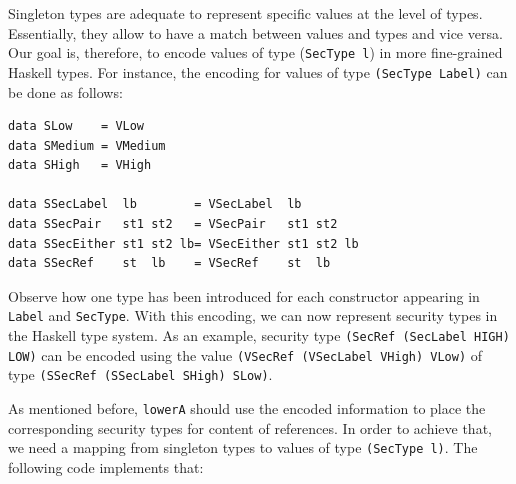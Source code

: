 \documentclass[times, 10pt,twocolumn]{article}
\begin{document}
Singleton types \cite{pierce:AdvanceTypeBook} are adequate to represent specific 
values at the level of types. Essentially, they allow to have a match 
between values and types and vice versa. 
Our goal is, therefore, to 
encode values of type
(\texttt{SecType l}) in more fine-grained Haskell types. For instance, 
the encoding for values of type \texttt{(SecType Label)}
can be done as follows:
\begin{Verbatim}[fontsize=\footnotesize]
data SLow    = VLow
data SMedium = VMedium
data SHigh   = VHigh

data SSecLabel  lb        = VSecLabel  lb
data SSecPair   st1 st2   = VSecPair   st1 st2
data SSecEither st1 st2 lb= VSecEither st1 st2 lb
data SSecRef    st  lb    = VSecRef    st  lb
\end{Verbatim}
Observe how one type has been introduced for each constructor appearing in 
\texttt{Label} and \texttt{SecType}. With this encoding,  
we can now represent security types in the Haskell type system. 
As an example, security type 
\texttt{(SecRef (SecLabel HIGH) LOW)} can be encoded using the 
value \texttt{(VSecRef (VSecLabel VHigh) VLow)} of type 
\texttt{(SSecRef (SSecLabel SHigh) SLow)}. %

As mentioned before, \texttt{lowerA} should use the encoded 
information to place the corresponding 
security types for content of references. 
In order to achieve that, we need a mapping 
from singleton types to values
of type \texttt{(SecType l)}. The following code implements that: 
\end{document}
